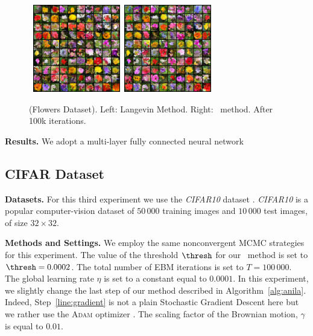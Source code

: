 \documentclass[10pt,twocolumn,letterpaper]{article}
\begin{document}
\begin{figure}[H]
\begin{center}
        \mbox{
        \includegraphics[width=1.5in]{figs/flowerslangevin}
        \includegraphics[width=1.5in]{figs/flowersanila}
        }
\end{center}
	\caption{(Flowers Dataset). Left: Langevin Method. Right: \algo\ method. After 100k iterations.}
	\label{fig:flowers}
\end{figure}

\medskip
\textbf{Results.} We adopt a multi-layer fully connected neural network






\subsection{CIFAR Dataset}

\textbf{Datasets.}
For this third experiment we use the \textit{CIFAR10} dataset \cite{krizhevsky2009learning}.
\textit{CIFAR10}  is a popular computer-vision dataset of $50\,000$ training images and $10\,000$ test images, of size $32\times 32$. 


\medskip
\textbf{Methods and Settings.}
We employ the same nonconvergent MCMC strategies for this experiment.
The value of the threshold $\thresh$ for our \algo\ method is set to $\thresh = 0.0002$.
The total number of EBM iterations is set to $T = 100\,000$.
The global learning rate $\eta$ is set to a constant equal to $0.0001$.
In this experiment, we slightly change the last step of our method described in Algorithm~\ref{alg:anila}.
Indeed, Step~\ref{line:gradient} is not a plain Stochastic Gradient Descent here but we rather use the \textsc{Adam} optimizer \cite{KB15}.
The scaling factor of the Brownian motion, $\gamma$ is equal to $0.01$.
\end{document}
